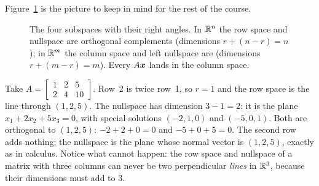 Figure~\ref{fig:u16-bigpicture} is the picture to keep in mind for the rest of the course.

\begin{figure}[ht]
  \centering
  \caption{The four subspaces with their right angles. In $\mathbb{R}^n$ the row space and nullspace
  are orthogonal complements (dimensions $r+(n-r)=n$); in $\mathbb{R}^m$ the column space and left
  nullspace are (dimensions $r+(m-r)=m$). Every $A\boldsymbol{x}$ lands in the column space.}
  \label{fig:u16-bigpicture}
\end{figure}

\begin{example}\label{ex:u16-plane}
Take $A=\begin{bmatrix}1&2&5\\2&4&10\end{bmatrix}$. Row~2 is twice row~1, so $r=1$ and the
row space is the line through $(1,2,5)$. The nullspace has dimension $3-1=2$: it is the plane
$x_1+2x_2+5x_3=0$, with special solutions $(-2,1,0)$ and $(-5,0,1)$. Both are orthogonal to
$(1,2,5)$: $-2+2+0=0$ and $-5+0+5=0$. The second row adds nothing; the nullspace is the plane
whose normal vector is $(1,2,5)$, exactly as in calculus. Notice what cannot happen: the row
space and nullspace of a matrix with three columns can never be two perpendicular
\emph{lines} in $\mathbb{R}^3$, because their dimensions must add to $3$.
\end{example}

